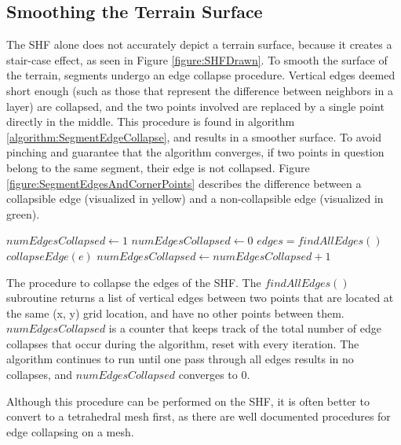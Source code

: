 \subsection{Smoothing the Terrain Surface}
\label{section:ErosionSimulationSmoothingTheTerrainSurface}

The SHF alone does not accurately depict a terrain surface, because it creates a stair-case effect, as seen in Figure \ref{figure:SHFDrawn}. To smooth the surface of the terrain, segments undergo an edge collapse procedure. Vertical edges deemed short enough (such as those that represent the difference between neighbors in a layer) are collapsed, and the two points involved are replaced by a single point directly in the middle. This procedure is found in algorithm \ref{algorithm:SegmentEdgeCollapse}, and results in a smoother surface. To avoid pinching and guarantee that the algorithm converges, if two points in question belong to the same segment, their edge is not collapsed. Figure \ref{figure:SegmentEdgesAndCornerPoints} describes the difference between a collapsible edge (visualized in yellow) and a non-collapsible edge (visualized in green).


\begin{algorithm}[t]
\begin{algorithmic}
  \STATE $numEdgesCollapsed \gets 1$
    \STATE $numEdgesCollapsed \gets 0$
    \STATE $edges = findAllEdges()$
	\STATE $collapseEdge( e )$
	\STATE $numEdgesCollapsed \gets numEdgesCollapsed + 1$
      \ENDIF
    \ENDFOR
  \ENDWHILE
\end{algorithmic}
\caption[Algorithm for segment edge collapsing]{\label{algorithm:SegmentEdgeCollapse} The procedure to collapse the edges of the SHF. The $findAllEdges()$ subroutine returns a list of vertical edges between two points that are located at the same (x, y) grid location, and have no other points between them. $numEdgesCollapsed$ is a counter that keeps track of the total number of edge collapses that occur during the algorithm, reset with every iteration. The algorithm continues to run until one pass through all edges results in no collapses, and $numEdgesCollapsed$ converges to 0.}
\end{algorithm}

Although this procedure can be performed on the SHF, it is often better to convert to a tetrahedral mesh first, as there are well documented procedures for edge collapsing on a mesh.



